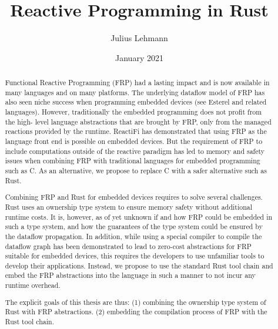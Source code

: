 \documentclass[10pt,showtrims,a4paper,oneside]{memoir} %
\title{Reactive Programming in Rust} %
\author{Julius Lehmann} %
\date{January 2021} %
\begin{document}
\begin{titlingpage}
\maketitle %
\end{titlingpage}

\frontmatter %



\begin{abstract}
Functional Reactive Programming (FRP) had a lasting impact and is now
available in many languages and on many platforms. The underlying
dataflow model of FRP has also seen niche success when programming
embedded devices (see Esterel and related languages). However,
traditionally the embedded programming does not profit from the high-
level language abstractions that are brought by FRP, only from the
managed reactions provided by the runtime. ReactiFi has demonstrated
that using FRP as the language front end is possible on embedded
devices. But the requirement of FRP to include computations outside of
the reactive paradigm has led to memory and safety issues when combining
FRP with traditional languages for embedded programming such as C. As an
alternative, we propose to replace C with a safer alternative such as
Rust.

Combining FRP and Rust for embedded devices requires to solve several
challenges. Rust uses an ownership type system to ensure memory safety
without additional runtime costs. It is, however, as of yet unknown if
and how FRP could be embedded in such a type system, and how the
guarantees of the type system could be ensured by the dataflow
propagation. In addition, while using a special compiler to compile the
dataflow graph has been demonstrated to lead to zero-cost abstractions
for FRP suitable for embedded devices, this requires the developers to
use unfamiliar tools to develop their applications. Instead, we propose
to use the standard Rust tool chain and embed the FRP abstractions into
the language in such a manner to not incur any runtime overhead.

The explicit goals of this thesis are thus: (1) combining the ownership
type system of Rust with FRP abstractions. (2) embedding the compilation
process of FRP with the Rust tool chain.
\end{abstract}
\end{document}
